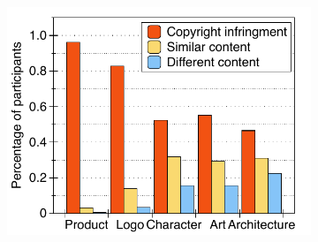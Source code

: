 \begin{table}[t]
\begin{adjustbox}{width=\linewidth}
\begin{tabular}{ccl}
            \bottomrule
        \end{tabular}
    \end{adjustbox}
    \label{table:prompt_example}
    \vspace{-0.2in}
\end{table}
\begin{figure}
  \begin{minipage}[t]{0.33\textwidth}
        \begin{subfigure}[t]{0.98\linewidth}
            \centering
            \includegraphics[width=0.99\linewidth]{figure_folder/human_eval.pdf}
        \end{subfigure} 
        \vspace{-0.1in}
        \caption{\small Results of human evaluation on each catergory}
        \label{fig:human_eval1}
    \end{minipage}
    \begin{minipage}[t]{0.33\textwidth}
        \begin{subfigure}[t]{0.98\linewidth}
            \centering

\end{subfigure}
\end{minipage}
\end{figure}

